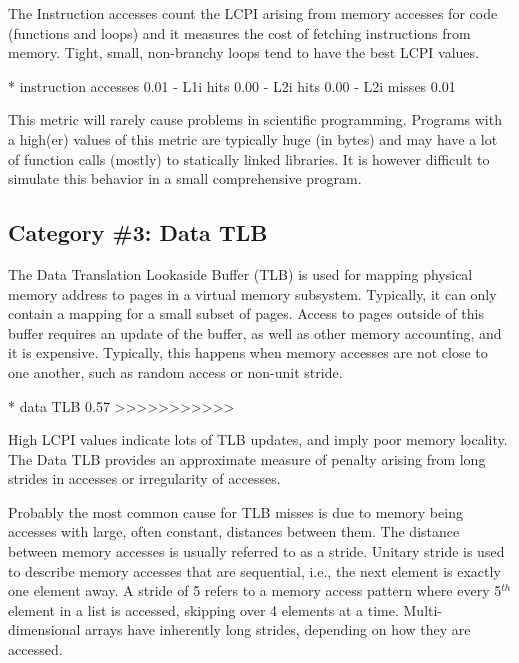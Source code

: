 The Instruction accesses count the LCPI arising from memory accesses for code (functions and loops) and it measures the cost of fetching instructions from memory. Tight, small, non-branchy loops tend to have the best LCPI values.

\begin{prompt}
* instruction accesses  0.01
 - L1i hits             0.00
 - L2i hits             0.00
 - L2i misses           0.01
\end{prompt}

This metric will rarely cause problems in scientific programming. Programs with a high(er) values of this metric are typically huge (in bytes) and may have a lot of function calls (mostly) to statically linked libraries. It is however difficult to simulate this behavior in a small comprehensive program.

\subsection{Category \#3: Data TLB}
\label{subsec:CAT3_Data_TLB}

The Data Translation Lookaside Buffer (TLB) is used for mapping physical memory address to pages in a virtual memory subsystem. Typically, it can only contain a mapping for a small subset of pages. Access to pages outside of this buffer requires an update of the buffer, as well as other memory accounting, and it is expensive. Typically, this happens when memory accesses are not close to one another, such as random access or non-unit stride.

\begin{prompt}
* data TLB              0.57 >>>>>>>>>>>
\end{prompt}

High LCPI values indicate lots of TLB updates, and imply poor memory locality. The Data TLB provides an approximate measure of penalty arising from long strides in accesses or irregularity of accesses.

Probably the most common cause for TLB misses is due to memory being accesses with large, often constant, distances between them. The distance between memory accesses is usually referred to as a stride. Unitary stride is used to describe memory accesses that are sequential, i.e., the next element is exactly one element away. A stride of 5 refers to a memory access pattern where every 5${}^{th}$ element in a list is accessed, skipping over 4 elements at a time. Multi-dimensional arrays have inherently long strides, depending on how they are accessed.

